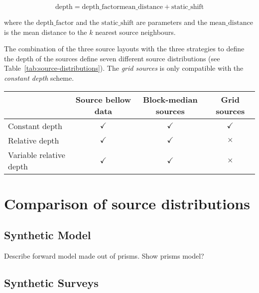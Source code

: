 \documentclass[twocolumn]{article}
\begin{document}
\begin{equation}
    \textrm{depth} =
        \textrm{depth_factor} \textrm{mean_distance} + \textrm{static_shift}
\end{equation}

\noindent where the $\textrm{depth_factor}$ and the $\textrm{static_shift}$ are
parameters and the $\textrm{mean_distance}$ is the mean distance to the $k$ nearest
source neighbours.


The combination of the three source layouts with the three strategies to define the
depth of the sources define seven different source distributions
(see Table~\ref{tab:source-distributions}).
The \emph{grid sources} is only compatible with the \emph{constant depth} scheme.


\begin{table*}
    \begin{minipage}{80mm}
        \caption{
            Source distributions as combinations of source layouts and depth
            strategies.
        }
        \label{tab:source-distributions}
        \begin{tabular}{lccc}
            & Source bellow data & Block-median sources & Grid sources \\ \hline
            Constant depth          & $\checkmark$ & $\checkmark$ & $\checkmark$ \\
            Relative depth          & $\checkmark$ & $\checkmark$ & $\times$     \\
            Variable relative depth & $\checkmark$ & $\checkmark$ & $\times$     \\
        \end{tabular}
    \end{minipage}
\end{table*}



\section{Comparison of source distributions}

\subsection{Synthetic Model}

Describe forward model made out of prisms.
Show prisms model?

\subsection{Synthetic Surveys}
\end{document}
